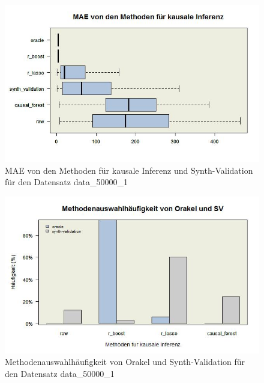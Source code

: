 \documentclass[12pt,a4paper,twoside]{scrartcl}
\numberwithin{equation}{section}
\newcounter{mypagecount}%
\newenvironment{interlude}{%
  \clearpage
  \setcounter{mypagecount}{\value{page}}%
  \thispagestyle{empty}%
  \pagestyle{empty}%
}{%
  \clearpage
  \setcounter{page}{\value{mypagecount}}%
}
\begin{document}
\begin{interlude}
\begin{appendices}
\begin{center}
\begin{figure}[H]
    \centering
    \includegraphics[height=0.5\textwidth, width=1\textwidth]{figures/plots/appendix/rawData50000aBoxplot.jpeg}
    \caption[MAE von den Methoden für kausale Inferenz und Synth-Validation für den Datensatz data\_50000\_1]{MAE von den Methoden für kausale Inferenz und Synth-Validation für den Datensatz data\_50000\_1}
  \end{figure}
\end{center}

\begin{center}
\begin{figure}[H]
    \centering
    \includegraphics[height=0.5\textwidth, width=1\textwidth]{figures/plots/appendix/rawData50000aBarplot.jpeg}
    \caption[Methodenauswahlhäufigkeit von Orakel und Synth-Validation für den Datensatz data\_50000\_1]{Methodenauswahlhäufigkeit von Orakel und Synth-Validation für den Datensatz data\_50000\_1}
  \end{figure}
\end{center}


\end{appendices}
\end{interlude}
\end{document}
